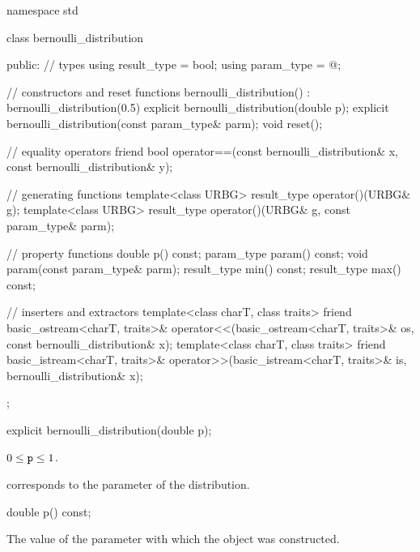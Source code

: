 %
%
\begin{codeblock}
namespace std {
  class bernoulli_distribution {
  public:
    // types
    using result_type = bool;
    using param_type  = @\unspec@;

    // constructors and reset functions
    bernoulli_distribution() : bernoulli_distribution(0.5) {}
    explicit bernoulli_distribution(double p);
    explicit bernoulli_distribution(const param_type& parm);
    void reset();

    // equality operators
    friend bool operator==(const bernoulli_distribution& x, const bernoulli_distribution& y);

    // generating functions
    template<class URBG>
      result_type operator()(URBG& g);
    template<class URBG>
      result_type operator()(URBG& g, const param_type& parm);

    // property functions
    double p() const;
    param_type param() const;
    void param(const param_type& parm);
    result_type min() const;
    result_type max() const;

    // inserters and extractors
    template<class charT, class traits>
      friend basic_ostream<charT, traits>&
        operator<<(basic_ostream<charT, traits>& os, const bernoulli_distribution& x);
    template<class charT, class traits>
      friend basic_istream<charT, traits>&
        operator>>(basic_istream<charT, traits>& is, bernoulli_distribution& x);
  };
}
\end{codeblock}


%
\begin{itemdecl}
explicit bernoulli_distribution(double p);
\end{itemdecl}

\begin{itemdescr}
\pnum
\expects
$0 \leq \texttt{\protect p} \leq 1$.

\pnum
\remarks
 corresponds to the parameter of the distribution.
\end{itemdescr}

%
\begin{itemdecl}
double p() const;
\end{itemdecl}

\begin{itemdescr}
\pnum
\returns
The value of the  parameter
 with which the object was constructed.
\end{itemdescr}


